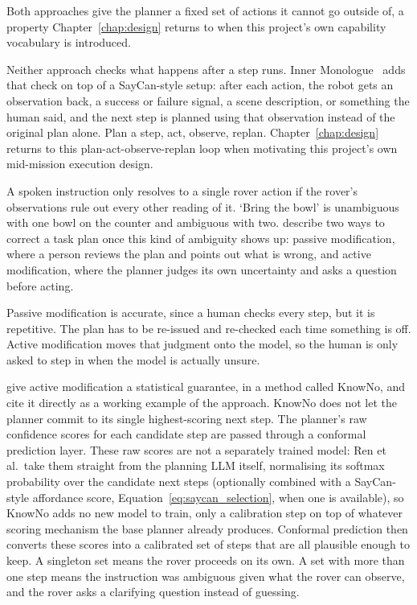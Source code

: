 Both approaches give the planner a fixed set of actions it cannot go outside of, a property
Chapter~\ref{chap:design} returns to when this project's own capability vocabulary is introduced.

Neither approach checks what happens after a step runs. Inner Monologue~\cite{huang2023innermonologue}
adds that check on top of a SayCan-style setup: after each action, the robot gets an observation
back, a success or failure signal, a scene description, or something the human said, and the next
step is planned using that observation instead of the original plan alone. Plan a step, act,
observe, replan. Chapter~\ref{chap:design} returns to this plan-act-observe-replan loop when
motivating this project's own mid-mission execution design.

\label{sec:clarification_lit}

A spoken instruction only resolves to a single rover action if the rover's 
observations rule out every other reading of it. `Bring the bowl' is unambiguous 
with one bowl on the counter 
and ambiguous with two. \citet{hori2025longhorizon} describe two ways to correct a 
task plan once this kind of ambiguity shows up: 
passive modification, where a person reviews the plan and 
points out what is wrong, and active modification, where the planner 
judges its own uncertainty and asks a question before acting. 

Passive modification is accurate, since a human checks every step, but it is repetitive. 
The plan has to be re-issued and re-checked 
each time something is off. Active modification moves that judgment onto the model, 
so the human is only asked to step in when the model is actually unsure.

\citet{ren2023knowno} give active modification a statistical guarantee, in a method called
KnowNo, and \citeauthor{hori2025longhorizon} cite it directly as a working example of the
approach. KnowNo does not let the planner commit to its single highest-scoring next step. The
planner's raw confidence scores for each candidate step are passed through a conformal prediction
layer. These raw scores are not a separately trained model: Ren et al.\ take them straight from
the planning LLM itself, normalising its softmax probability over the candidate next steps
(optionally combined with a SayCan-style affordance score, Equation~\ref{eq:saycan_selection},
when one is available), so KnowNo adds no new model to train, only a calibration step on top of
whatever scoring mechanism the base planner already produces. Conformal prediction then converts
these scores into a calibrated set of steps that are all plausible enough to keep. A singleton set
means the rover proceeds on its own. A set with more than one step means the instruction was
ambiguous given what the rover can observe, and the rover asks a clarifying question instead of
guessing.


